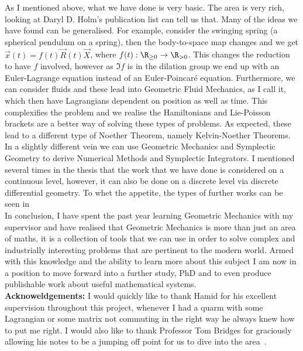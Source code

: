 \noindent
As I mentioned above, what we have done is very basic. The area is very rich, looking at Daryl D. Holm's publication list can tell us that. Many of the ideas we have found can be generalised. For example, consider the swinging spring (a spherical pendulum on a spring), then the body-to-space map changes and we get $\vec x(t) = f(t)\vec R(t)\vec X$, where $f(t) : \R_{\ge 0} \to \R_{> 0}$. This changes the reduction to have $f$ involved, however as $\Im f$ is in the dilation group we end up with an Euler-Lagrange equation instead of an Euler-Poincar\'e equation. Furthermore, we can consider fluids and these lead into Geometric Fluid Mechanics, as I call it, which then have Lagrangians dependent on position as well as time. This complexifies the problem and we realise the Hamiltonians and Lie-Poisson brackets are a better way of solving these types of problems. As expected, these lead to a different type of Noether Theorem, namely Kelvin-Noether Theorems. In a slightly different vein we can use Geometric Mechanics and Symplectic Geometry to derive Numerical Methods and Symplectic Integrators. I mentioned several times in the thesis that the work that we have done is considered on a continuous level, however, it can also be done on a discrete level via discrete differential geometry. To whet the appetite, the types of further works can be seen in \cite{doi:10.1098/rspa.2018.0642, alemi_ardakani_2019}\\

\noindent
In conclusion, I have spent the past year learning Geometric Mechanics with my supervisor and have realised that Geometric Mechanics is more than just an area of maths, it is a collection of tools that we can use in order to solve complex and industrially interesting problems that are pertinent to the modern world. Armed with this knowledge and the ability to learn more about this subject I am now in a position to move forward into a further study, PhD and to even produce publishable work about useful mathematical systems.\\

\noindent
\textbf{Acknoweldgements:} I would quickly like to thank Hamid for his excellent supervision throughout this project, whenever I had a quarm with some Lagrangian or some matrix not commuting in the right way he always knew how to put me right. I would also like to thank Professor Tom Bridges for graciously allowing his notes to be a jumping off point for us to dive into the area~\cite{bridges_notes}.